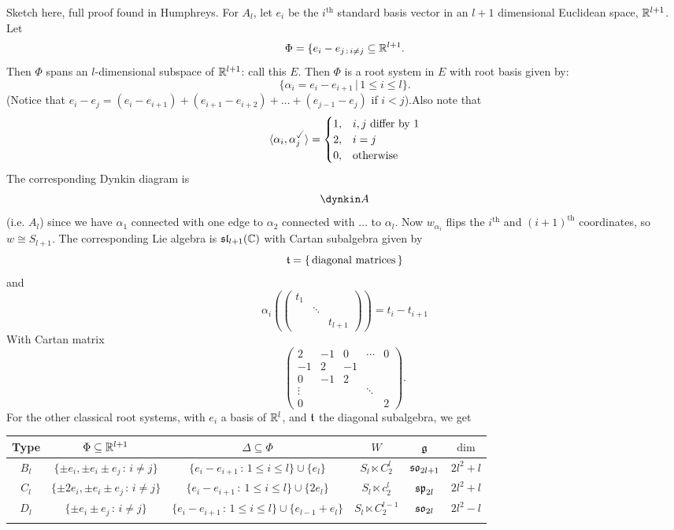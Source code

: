 \documentclass{article}
\begin{document}
\proof Sketch here, full proof found in Humphreys. \gap For $A_{l}$, let $e_{i}$ be the $i^{\text{th}}$ standard basis vector in an $l+1$ dimensional Euclidean space, $\mathbb{R}^{l+1}$. Let \[ \Phi = \{e_{i}-e_{j \, : \, i \neq j} \subseteq \mathbb{R}^{l+1}.\]
Then $\Phi$ spans an $l$-dimensional subspace of $\mathbb{R}^{l+1}$: call this $E$. Then $\Phi$ is a root system in $E$ with root basis given by: \[ \{\alpha_{i} = e_{i}-e_{i+1} \, | \, 1 \leq i \leq l \}.\] (Notice that $e_{i}-e_{j} = (e_{i} - e_{i+1}) +(e_{i+1} - e_{i+2}) + \dots + (e_{j-1} - e_{j})$ if $i<j$).\gap Also note that \[ \langle \alpha_{i}, \alpha_{j}^{\checked}\rangle = \begin{cases}
    1, & i,j \text{ differ by $1$}\\
    2, & i=j\\
    0, & \text{otherwise}
\end{cases}  \]
The corresponding Dynkin diagram is \[\dynkin A{}\] (i.e. $A_{l}$) since we have $\alpha_{1}$ connected with one edge to $\alpha_{2}$ connected with $\dots$ to $\alpha_{l}$. Now $w_{\alpha_{i}}$ flips the $i^{\text{th}}$ and $(i+1)^{\text{th}}$ coordinates, so $w \cong S_{l+1}$. The corresponding Lie algebra is $\mathfrak{sl}_{l+1}(\mathbb{C})$ with Cartan subalgebra given by \[ \mathfrak{t} = \{\, \text{diagonal matrices}\, \}\] and \[ \alpha_{i} \left( \begin{pmatrix}
    t_{1} & &\\
    & \ddots &\\
    & & t_{l+1}
\end{pmatrix} \right) = t_{i}-t_{i+1}\]
With Cartan matrix \[ \begin{pmatrix}
    2 & -1 & 0 & \cdots & 0\\
    -1 & 2 & -1 & &\\
    0 & -1 & 2 & &\\
    \vdots & & & \ddots &\\
    0 & & & & 2
\end{pmatrix}.\]
For the other classical root systems, with $e_{i}$ a basis of $\mathbb{R}^{l}$, and $\mathfrak{t}$ the diagonal subalgebra, we get 
\begin{center}
\begin{tabular}{c | c | c | c | c | c}
    Type & $\Phi \subseteq \mathbb{R}^{l+1}$ & $\Delta \subseteq \Phi$ & $W$ & $\mathfrak{g}$ & $\dim$\\ \hline 
    $B_{l}$ & $\{\pm e_{i}, \pm e_{i} \pm e_{j} \, : \, i \neq j\}$ & $\{e_{i}-e_{i+1} \, : \, 1 \leq i \leq l \} \cup \{e_{l}\}$ & $S_{l} \ltimes C_{2}^{l}$ & $\mathfrak{so}_{2l+1}$ & $2l^{2}+l$ \\ 
    $C_{l}$ & $\{ \pm 2e_{i}, \pm e_{i} \pm  e_{j} \, : \, i \neq j\}$& $\{e_{i} -e_{i+1} \, : \ 1 \leq i \leq l\} \cup \{ 2e_{l}\}$ & $S_{l} \ltimes c_{2}^{l}$ & $\mathfrak{sp}_{2l}$ & $2l^{2}+l$ \\
    $D_{l}$ & $\{ \pm e_{i} \pm e_{j} \, : \, i \neq j\}$ & $\{e_{i}-e_{i+1} \, : \, 1 \leq i \leq l\} \cup \{ e_{l-1}+e_{l} \}$ & $S_{l} \ltimes C_{2}^{l-1}$ & $\mathfrak{so}_{2l}$ & $2l^{2}-l$\\
    & & & & &
\end{tabular}
\end{center}
\end{document}
